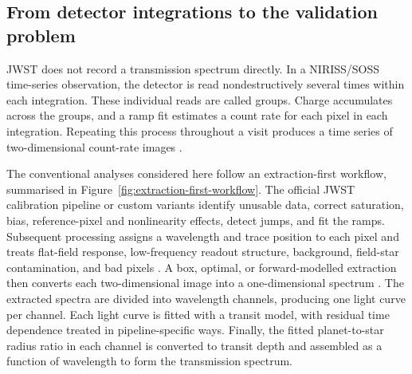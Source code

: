 \subsection{From detector integrations to the validation problem}
\label{sec:detector-to-validation}
\label{sec:detector-to-spectrum}
\label{sec:validation-problem}


JWST does not record a transmission spectrum directly. In a NIRISS/SOSS
time-series observation, the detector is read nondestructively several times
within each integration. These individual reads are called groups. Charge
accumulates across the groups, and a ramp fit estimates a count rate for each
pixel in each integration. Repeating this process throughout a visit produces a
time series of two-dimensional count-rate images
\citep{AlbertEtAl2023}.


The conventional analyses considered here follow an extraction-first workflow,
summarised in Figure~\ref{fig:extraction-first-workflow}. The official JWST
calibration pipeline or custom variants identify unusable data, correct
saturation, bias, reference-pixel and nonlinearity effects, detect jumps, and
fit the ramps. Subsequent processing assigns a wavelength and trace position to
each pixel and treats flat-field response, low-frequency readout structure,
background, field-star contamination, and bad pixels
\citep{BellEtAl2022,RadicaEtAl2023,LouieEtAl2025}. A box, optimal, or
forward-modelled extraction then converts each two-dimensional image into a
one-dimensional spectrum \citep{Horne1986}. The extracted spectra are divided
into wavelength channels, producing one light curve per channel. Each light
curve is fitted with a transit model, with residual time dependence treated in
pipeline-specific ways. Finally, the fitted planet-to-star radius ratio in
each channel is converted to transit depth and assembled as a function of
wavelength to form the transmission spectrum.

